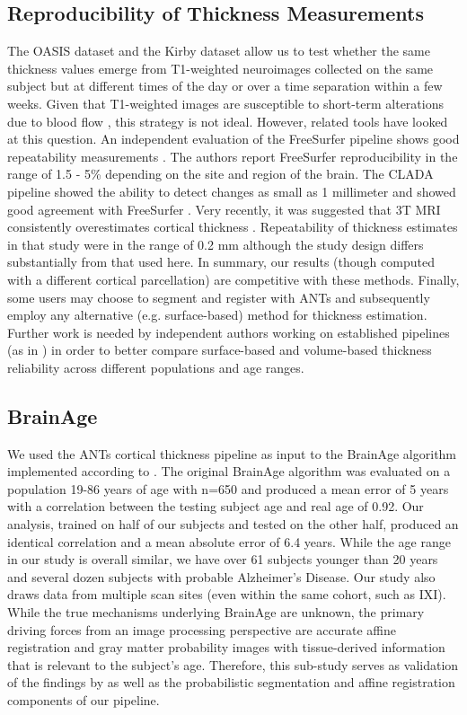 \subsection{Reproducibility of Thickness Measurements}
The OASIS dataset and the Kirby dataset allow us to test whether the same
thickness values emerge from T1-weighted
neuroimages collected on the same subject but at different times of
the day or over a time separation within a few weeks.  Given that
T1-weighted images are susceptible to short-term alterations due to
blood flow \cite{Franklin2013,Salgado-Pineda2006,Yamasue2007}, this strategy is not ideal.  However, related
tools have looked at this question. An independent evaluation of the FreeSurfer pipeline shows good
repeatability measurements \cite{jovicich2013}. The authors report
FreeSurfer reproducibility in the range of 1.5 - 5\% depending on the
site and region of the brain.  The CLADA pipeline showed the ability to detect
changes as small as 1 millimeter and showed good agreement with
FreeSurfer \cite{nakamura2011}. Very recently, it was suggested that 3T MRI
consistently overestimates cortical thickness \cite{lusebrink2013}.
Repeatability of thickness estimates in that study were in the range
of 0.2 mm although the study design differs substantially from that used here.
In summary, our results (though computed
with a different cortical parcellation) are competitive with these
methods.  Finally, some users may choose to segment and register
with ANTs and subsequently employ any alternative (e.g. surface-based)
method for thickness estimation.  Further work is needed by
independent authors working on established pipelines (as in \cite{lusebrink2013,jovicich2013}) in order to
better compare surface-based and volume-based thickness reliability
across different populations and age ranges. 

\subsection{BrainAge} 
We used the ANTs cortical thickness pipeline as input to the BrainAge
algorithm implemented according to \cite{franke2010}.  The original
BrainAge algorithm was evaluated on a population 19-86 years of age
with n=650 and produced a mean error of 5 years with a correlation
between the testing subject age and real age of 0.92.  Our analysis,
trained on half of our subjects and tested on the other half, produced
an identical correlation and a mean absolute error of 6.4 years.
While the age range in our study is overall similar, we have over
61 subjects younger than 20 years and several dozen subjects with
probable Alzheimer's Disease.  Our study also draws data from multiple
scan sites (even within the same cohort, such as IXI).  
While the true mechanisms underlying BrainAge are unknown, the
primary driving forces from an image processing perspective are accurate affine registration and gray
matter probability images with tissue-derived information that is
relevant to the subject's age.  Therefore, this sub-study serves as
validation of the findings by \cite{franke2010} as well as the
probabilistic segmentation and affine registration components of our
pipeline.


